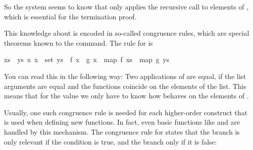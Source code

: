 \begin{isabellebody}
\begin{isamarkuptxt}
  So the system seems to know that  only
  applies the recursive call  to elements
  of , which is essential for the termination proof.

  This knowledge about  is encoded in so-called congruence rules,
  which are special theorems known to the  command. The
  rule for  is

  \begin{isabelle}%
{}{}xs\ {}\ {}ys{}\ {}x{}\ x\ {}\ set\ {}ys\ {}\ {}f\ x\ {}\ {}g\ x{}\ {}\ map\ {}f\ {}xs\ {}\ map\ {}g\ {}ys%
\end{isabelle}

  You can read this in the following way: Two applications of  are equal, if the list arguments are equal and the functions
  coincide on the elements of the list. This means that for the value 
   we only have to know how  behaves on
  the elements of .

  Usually, one such congruence rule is
  needed for each higher-order construct that is used when defining
  new functions. In fact, even basic functions like  and  are handled by this mechanism. The congruence
  rule for  states that the  branch is only
  relevant if the condition is true, and the  branch only if it
  is false:


\end{isamarkuptxt}
\end{isabellebody}
